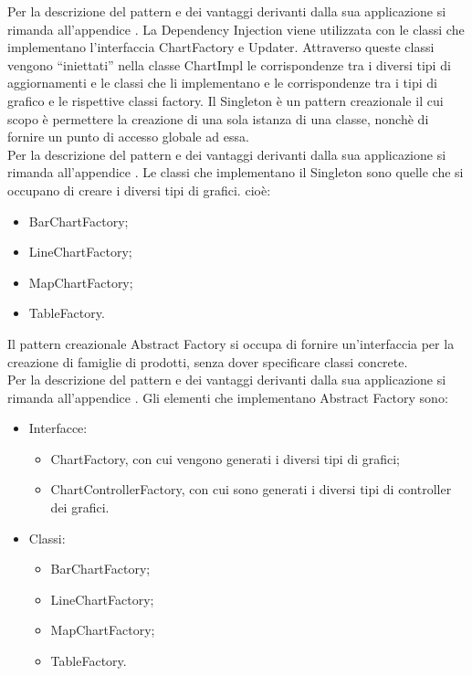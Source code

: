 	Per la descrizione del pattern e dei vantaggi derivanti dalla sua applicazione si rimanda all'appendice .
	La Dependency Injection viene utilizzata con le classi che implementano l'interfaccia ChartFactory e Updater. Attraverso queste classi vengono “iniettati” nella classe ChartImpl le corrispondenze tra i diversi tipi di aggiornamenti e le classi che li implementano e le corrispondenze tra i tipi di grafico e le rispettive classi factory.
	Il Singleton è un pattern creazionale il cui scopo è permettere la creazione di una sola istanza di una classe, nonchè di fornire un punto di accesso globale ad essa.\\
	Per la descrizione del pattern e dei vantaggi derivanti dalla sua applicazione si rimanda all'appendice .
	Le classi che implementano il Singleton sono quelle che si occupano di creare i diversi tipi di grafici. cioè:
	\begin{itemize}
	\item BarChartFactory;
	\item LineChartFactory;
	\item MapChartFactory;
	\item TableFactory.
	\end{itemize}
	Il pattern creazionale Abstract Factory si occupa di fornire un'interfaccia per la creazione di famiglie di prodotti, senza dover specificare classi concrete. \\
	Per la descrizione del pattern e dei vantaggi derivanti dalla sua applicazione si rimanda all'appendice .
	Gli elementi che implementano Abstract Factory sono:
	\begin{itemize}
	\item Interfacce:
		\begin{itemize}
			\item ChartFactory, con cui vengono generati i diversi tipi di grafici;
			\item ChartControllerFactory, con cui sono generati i diversi tipi di controller dei grafici.
		\end{itemize}
	\item Classi:
		\begin{itemize}
			\item BarChartFactory;
			\item LineChartFactory;
			\item MapChartFactory;
			\item TableFactory.
		\end{itemize}
	\end{itemize}
